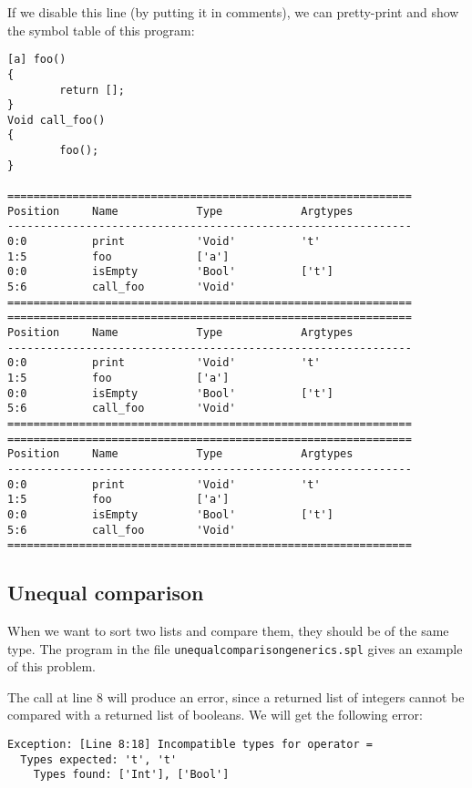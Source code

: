 \documentclass[a4paper]{article}
\begin{document}
If we disable this line (by putting it in comments), we can pretty-print and show the symbol table of this program:
\begin{verbatim}
[a] foo()
{
        return [];
}
Void call_foo()
{
        foo();
}

==============================================================
Position     Name            Type            Argtypes            
--------------------------------------------------------------
0:0          print           'Void'          't'                 
1:5          foo             ['a']                               
0:0          isEmpty         'Bool'          ['t']               
5:6          call_foo        'Void'                              
==============================================================
==============================================================
Position     Name            Type            Argtypes            
--------------------------------------------------------------
0:0          print           'Void'          't'                 
1:5          foo             ['a']                               
0:0          isEmpty         'Bool'          ['t']               
5:6          call_foo        'Void'                              
==============================================================
==============================================================
Position     Name            Type            Argtypes            
--------------------------------------------------------------
0:0          print           'Void'          't'                 
1:5          foo             ['a']                               
0:0          isEmpty         'Bool'          ['t']               
5:6          call_foo        'Void'                              
==============================================================
\end{verbatim}

\subsection{Unequal comparison}
When we want to sort two lists and compare them, they should be of the same type. The program in the file {\tt unequalcomparisongenerics.spl} gives an example of this problem.

The call at line 8 will produce an error, since a returned list of integers cannot be compared with a returned list of booleans. We will get the following error: 
\begin{verbatim}
Exception: [Line 8:18] Incompatible types for operator = 
  Types expected: 't', 't'
    Types found: ['Int'], ['Bool']
\end{verbatim}
\end{document}
